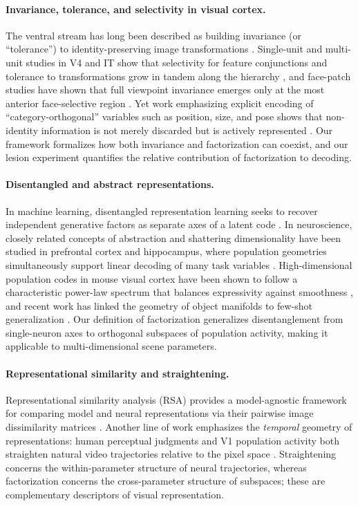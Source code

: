 \paragraph{Invariance, tolerance, and selectivity in visual cortex.}
The ventral stream has long been described as building invariance (or ``tolerance'') to identity-preserving image transformations \cite{dicarlo2007untangling,dicarlo2012how}. Single-unit and multi-unit studies in V4 and IT show that selectivity for feature conjunctions and tolerance to transformations grow in tandem along the hierarchy \cite{rust2012balanced}, and face-patch studies have shown that full viewpoint invariance emerges only at the most anterior face-selective region \cite{freiwald2010functional}. Yet work emphasizing explicit encoding of ``category-orthogonal'' variables such as position, size, and pose shows that non-identity information is not merely discarded but is actively represented \cite{hong2016explicit}. Our framework formalizes how both invariance and factorization can coexist, and our lesion experiment quantifies the relative contribution of factorization to decoding.

\paragraph{Disentangled and abstract representations.}
In machine learning, disentangled representation learning seeks to recover independent generative factors as separate axes of a latent code \cite{higgins2017beta}. In neuroscience, closely related concepts of abstraction and shattering dimensionality have been studied in prefrontal cortex and hippocampus, where population geometries simultaneously support linear decoding of many task variables \cite{bernardi2020geometry,rigotti2013importance,fusi2016why}. High-dimensional population codes in mouse visual cortex have been shown to follow a characteristic power-law spectrum that balances expressivity against smoothness \cite{stringer2019high}, and recent work has linked the geometry of object manifolds to few-shot generalization \cite{sorscher2022neural}. Our definition of factorization generalizes disentanglement from single-neuron axes to orthogonal subspaces of population activity, making it applicable to multi-dimensional scene parameters.

\paragraph{Representational similarity and straightening.}
Representational similarity analysis (RSA) provides a model-agnostic framework for comparing model and neural representations via their pairwise image dissimilarity matrices \cite{kriegeskorte2008representational,khalighrazavi2014deep,seeliger2017convolutional}. Another line of work emphasizes the \emph{temporal} geometry of representations: human perceptual judgments and V1 population activity both straighten natural video trajectories relative to the pixel space \cite{henaff2019perceptual,henaff2021primary}. Straightening concerns the within-parameter structure of neural trajectories, whereas factorization concerns the cross-parameter structure of subspaces; these are complementary descriptors of visual representation.


